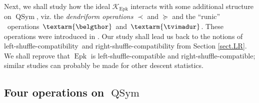 \documentclass[numbers=enddot,12pt,final,onecolumn,notitlepage]{scrartcl}%
\theoremstyle{definition}
\newenvironment{verlong}{}{}
\newcommand{\tvi}{\left. \textarm{\tvimadur} \right.}
\newcommand{\bel}{\left. \textarm{\belgthor} \right.}
\begin{document}
\begin{verlong}
Next, we shall study how the ideal $\mathcal{K}_{\operatorname*{Epk}}$
interacts with some additional structure on $\operatorname*{QSym}$, viz. the
\textit{dendriform operations }$\left.  \prec\right.  $ and $\left.
\succeq\right.  $ and the \textquotedblleft runic\textquotedblright%
\ operations $\bel$ and $\tvi$. These operations were introduced in
\cite{dimcr}. Our study shall lead us back to the notions of
left-shuffle-compatibility\ and right-shuffle-compatibility from Section
\ref{sect.LR}. We shall reprove that $\operatorname*{Epk}$ is
left-shuffle-compatible and right-shuffle-compatible; similar studies can
probably be made for other descent statistics.

\subsection{Four operations on $\operatorname*{QSym}$}


\end{verlong}
\end{document}
